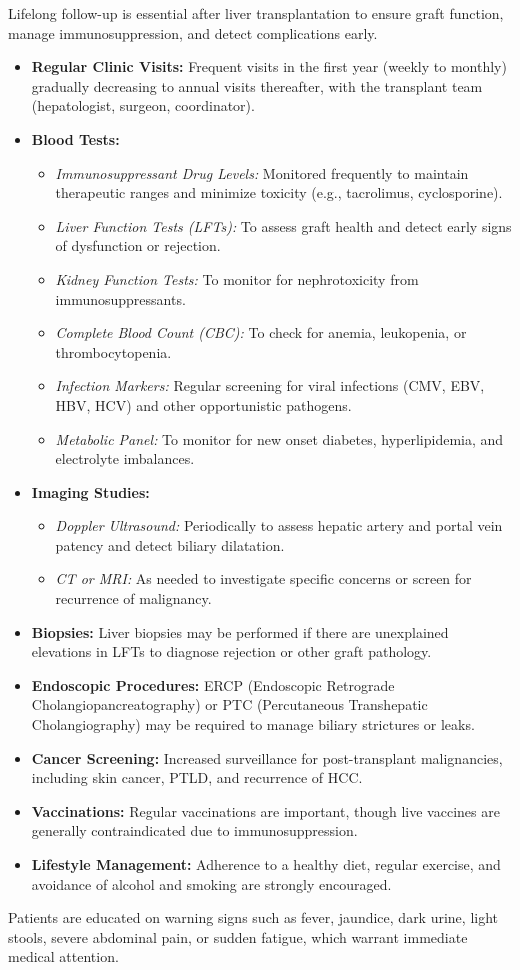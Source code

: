 Lifelong follow-up is essential after liver transplantation to ensure graft function, manage immunosuppression, and detect complications early.
\begin{itemize}
  \item \textbf{Regular Clinic Visits:} Frequent visits in the first year (weekly to monthly) gradually decreasing to annual visits thereafter, with the transplant team (hepatologist, surgeon, coordinator).
  \item \textbf{Blood Tests:}
    \begin{itemize}
      \item \textit{Immunosuppressant Drug Levels:} Monitored frequently to maintain therapeutic ranges and minimize toxicity (e.g., tacrolimus, cyclosporine).
      \item \textit{Liver Function Tests (LFTs):} To assess graft health and detect early signs of dysfunction or rejection.
      \item \textit{Kidney Function Tests:} To monitor for nephrotoxicity from immunosuppressants.
      \item \textit{Complete Blood Count (CBC):} To check for anemia, leukopenia, or thrombocytopenia.
      \item \textit{Infection Markers:} Regular screening for viral infections (CMV, EBV, HBV, HCV) and other opportunistic pathogens.
      \item \textit{Metabolic Panel:} To monitor for new onset diabetes, hyperlipidemia, and electrolyte imbalances.
    \end{itemize}
  \item \textbf{Imaging Studies:}
    \begin{itemize}
      \item \textit{Doppler Ultrasound:} Periodically to assess hepatic artery and portal vein patency and detect biliary dilatation.
      \item \textit{CT or MRI:} As needed to investigate specific concerns or screen for recurrence of malignancy.
    \end{itemize}
  \item \textbf{Biopsies:} Liver biopsies may be performed if there are unexplained elevations in LFTs to diagnose rejection or other graft pathology.
  \item \textbf{Endoscopic Procedures:} ERCP (Endoscopic Retrograde Cholangiopancreatography) or PTC (Percutaneous Transhepatic Cholangiography) may be required to manage biliary strictures or leaks.
  \item \textbf{Cancer Screening:} Increased surveillance for post-transplant malignancies, including skin cancer, PTLD, and recurrence of HCC.
  \item \textbf{Vaccinations:} Regular vaccinations are important, though live vaccines are generally contraindicated due to immunosuppression.
  \item \textbf{Lifestyle Management:} Adherence to a healthy diet, regular exercise, and avoidance of alcohol and smoking are strongly encouraged.
\end{itemize}
Patients are educated on warning signs such as fever, jaundice, dark urine, light stools, severe abdominal pain, or sudden fatigue, which warrant immediate medical attention.

